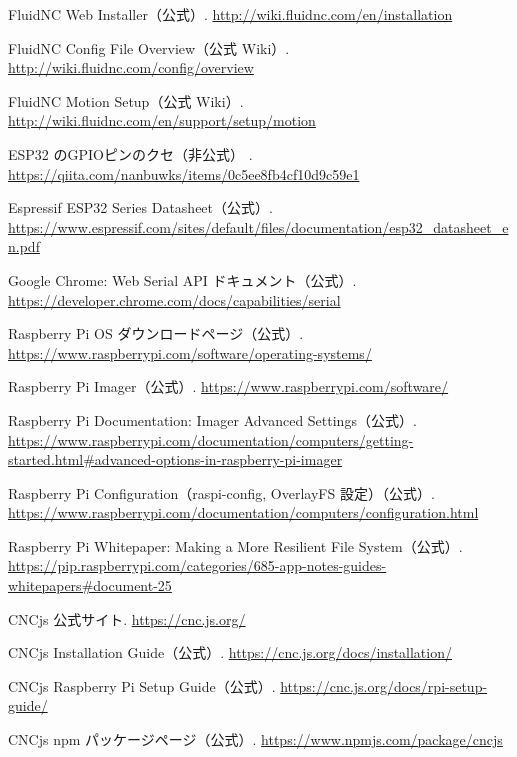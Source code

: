 \documentclass[uplatex,dvipdfmx]{ujarticle}
\begin{document}
\begin{thebibliography}{999}

FluidNC Web Installer（公式）.  
\url{http://wiki.fluidnc.com/en/installation}

FluidNC Config File Overview（公式 Wiki）.  
\url{http://wiki.fluidnc.com/config/overview}

FluidNC Motion Setup（公式 Wiki）.  
\url{http://wiki.fluidnc.com/en/support/setup/motion}

ESP32 のGPIOピンのクセ（非公式） . 
\url{https://qiita.com/nanbuwks/items/0c5ee8fb4cf10d9c59e1}

Espressif ESP32 Series Datasheet（公式）.  
\url{https://www.espressif.com/sites/default/files/documentation/esp32_datasheet_en.pdf}

Google Chrome: Web Serial API ドキュメント（公式）.  
\url{https://developer.chrome.com/docs/capabilities/serial}

Raspberry Pi OS ダウンロードページ（公式）.  
\url{https://www.raspberrypi.com/software/operating-systems/}

Raspberry Pi Imager（公式）.  
\url{https://www.raspberrypi.com/software/}

Raspberry Pi Documentation: Imager Advanced Settings（公式）.  
\url{https://www.raspberrypi.com/documentation/computers/getting-started.html#advanced-options-in-raspberry-pi-imager}

Raspberry Pi Configuration（raspi-config, OverlayFS 設定）（公式）.  
\url{https://www.raspberrypi.com/documentation/computers/configuration.html}

Raspberry Pi Whitepaper: Making a More Resilient File System（公式）.  
\url{https://pip.raspberrypi.com/categories/685-app-notes-guides-whitepapers#document-25}

CNCjs 公式サイト.  
\url{https://cnc.js.org/}

CNCjs Installation Guide（公式）.  
\url{https://cnc.js.org/docs/installation/}

CNCjs Raspberry Pi Setup Guide（公式）.  
\url{https://cnc.js.org/docs/rpi-setup-guide/}

CNCjs npm パッケージページ（公式）.  
\url{https://www.npmjs.com/package/cncjs}


\end{thebibliography}
\end{document}
